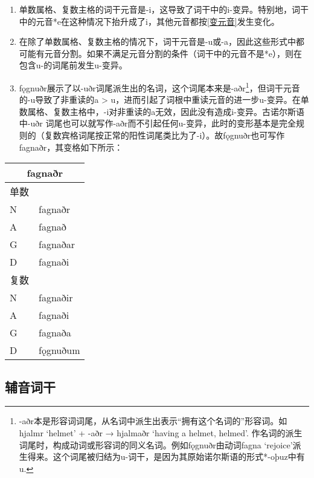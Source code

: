 \begin{enumerate}
  \def\labelenumi{\arabic{enumi})}
  \item
        单数属格、复数主格的词干元音是-i，这导致了词干中的i-变异。特别地，词干中的元音*e在这种情况下抬升成了i，其他元音都按\ref{变元音}发生变化。
  \item
        在除了单数属格、复数主格的情况下，词干元音是-u或-a，因此这些形式中都可能有元音分割。如果不满足元音分割的条件（词干中的元音不是*e），则在包含u-的词尾前发生u-变异。
  \item
        fǫgnuðr展示了以-uðr词尾派生出的名词，这个词尾本来是-aðr\footnote{-aðr本是形容词词尾，从名词中派生出表示``拥有这个名词的''形容词。如hjalmr
          `helmet' + -aðr → hjalmaðr `having a helmet, helmed'.
          作名词的派生词尾时，构成动词或形容词的同义名词。例如fǫgnuðr由动词fagna
          `rejoice'派生得来。这个词尾被归结为u-词干，是因为其原始诺尔斯语的形式*-oþuz中有u.}，但词干元音的-u导致了非重读的a
        \textgreater{}
        u，进而引起了词根中重读元音的进一步u-变异。在单数属格、复数主格中，-i对非重读的a无效，因此没有造成i-变异。古诺尔斯语中-uðr
        词尾也可以就写作-aðr而不引起任何u-变异，此时的变形基本是完全规则的（复数宾格词尾按正常的阳性词尾类比为了-i）。故fǫgnuðr也可写作fagnaðr，其变格如下所示：
\end{enumerate}

\begin{longtable}{ll}
  \toprule
  \multicolumn{2}{c}{fagnaðr} \\
  \midrule
  \endhead
  \bottomrule
  \endfoot
  单数 &                        \\
  N  & fagnaðr                \\
  A  & fagnað                 \\
  G  & fagnaðar               \\
  D  & fagnaði                \\
  复数 &                        \\
  N  & fagnaðir               \\
  A  & fagnaði                \\
  G  & fagnaða                \\
  D  & fǫgnuðum               \\
\end{longtable}

\subsection{辅音词干}\label{辅音词干}

